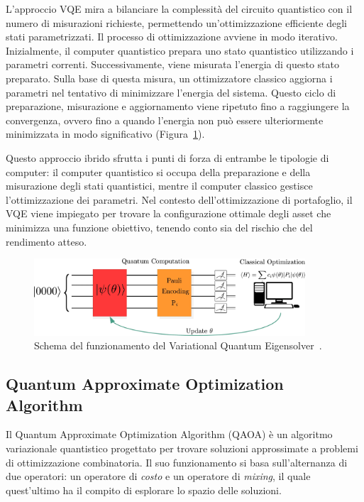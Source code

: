L'approccio VQE mira a bilanciare la complessità del circuito quantistico con il 
numero di misurazioni richieste, permettendo un'ottimizzazione efficiente degli 
stati parametrizzati. Il processo di ottimizzazione avviene in modo iterativo. 
Inizialmente, il computer quantistico prepara uno stato quantistico utilizzando 
i parametri correnti. Successivamente, viene misurata l'energia di questo stato 
preparato. Sulla base di questa misura, un ottimizzatore classico aggiorna i 
parametri nel tentativo di minimizzare l'energia del sistema. Questo ciclo di 
preparazione, misurazione e aggiornamento viene ripetuto fino a raggiungere la 
convergenza, ovvero fino a quando l'energia non può essere ulteriormente 
minimizzata in modo significativo (Figura~\ref{fig:circuitoVQE}).

Questo approccio ibrido sfrutta i punti di forza di entrambe le tipologie di 
computer: il computer quantistico si occupa della preparazione e della misurazione 
degli stati quantistici, mentre il computer classico gestisce l'ottimizzazione 
dei parametri. Nel contesto dell'ottimizzazione di portafoglio, il VQE viene 
impiegato per trovare la configurazione ottimale degli asset che minimizza una 
funzione obiettivo, tenendo conto sia del rischio che del rendimento atteso.

\begin{figure}[h!]
    \centering
    \includegraphics[width=0.9\textwidth]{images/vqe.png}
    \caption{Schema del funzionamento del Variational Quantum Eigensolver~\cite{buonaiuto2023best}.}
    \label{fig:circuitoVQE}
\end{figure}




\subsection{Quantum Approximate Optimization Algorithm}\label{sec:qaoa}
Il Quantum Approximate Optimization Algorithm (QAOA) è un algoritmo variazionale 
quantistico progettato per trovare soluzioni approssimate a problemi di 
ottimizzazione combinatoria. Il suo funzionamento si basa sull'alternanza di 
due operatori: un operatore di \textit{costo} e un operatore di \textit{mixing}, 
il quale quest'ultimo ha il compito di esplorare lo spazio delle soluzioni.


